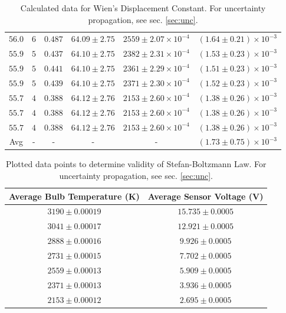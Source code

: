 \documentclass[12pt]{article}
\begin{document}
\begin{table}[htbp]
\begin{tabular}{cccccc}
        $56.0$ & $6$ & $0.487$ & $64.09 \pm 2.75$ & $2559 \pm 2.07 \times 10^{-4}$ & $(1.64 \pm 0.21) \times 10^{-3}$ \\
        $55.9$ & $5$ & $0.437$ & $64.10 \pm 2.75$ & $2382 \pm 2.31 \times 10^{-4}$ & $(1.53 \pm 0.23) \times 10^{-3}$ \\
        $55.9$ & $5$ & $0.441$ & $64.10 \pm 2.75$ & $2361 \pm 2.29 \times 10^{-4}$ & $(1.51 \pm 0.23) \times 10^{-3}$ \\
        $55.9$ & $5$ & $0.439$ & $64.10 \pm 2.75$ & $2371 \pm 2.30 \times 10^{-4}$ & $(1.52 \pm 0.23) \times 10^{-3}$ \\
        $55.7$ & $4$ & $0.388$ & $64.12 \pm 2.76$ & $2153 \pm 2.60 \times 10^{-4}$ & $(1.38 \pm 0.26) \times 10^{-3}$ \\
        $55.7$ & $4$ & $0.388$ & $64.12 \pm 2.76$ & $2153 \pm 2.60 \times 10^{-4}$ & $(1.38 \pm 0.26) \times 10^{-3}$ \\
        $55.7$ & $4$ & $0.388$ & $64.12 \pm 2.76$ & $2153 \pm 2.60 \times 10^{-4}$ & $(1.38 \pm 0.26) \times 10^{-3}$ \\
        \midrule
        Avg & - & - & - & -  & $(1.73 \pm 0.75) \times 10^{-3}$ \\
        \bottomrule
    \end{tabular}
      \caption{Calculated data for Wien's Displacement Constant. For uncertainty propagation, see sec. \ref{sec:unc}.}
      \label{table:wien}
\end{table}

\begin{table}[]
    \centering
\begin{tabular}{cc}
\hline
Average Bulb Temperature (K) & Average Sensor Voltage (V) \\
\hline
$3190 \pm 0.00019$ & $15.735 \pm 0.0005$ \\
$3041 \pm 0.00017$ & $12.921 \pm 0.0005$ \\
$2888 \pm 0.00016$ & $9.926 \pm 0.0005$ \\
$2731 \pm 0.00015$ & $7.702 \pm 0.0005$ \\
$2559 \pm 0.00013$ & $5.909 \pm 0.0005$ \\
$2371 \pm 0.00013$ & $3.936 \pm 0.0005$ \\
$2153 \pm 0.00012$ & $2.695 \pm 0.0005$ \\
\hline
\end{tabular}
    \caption{Plotted data points to determine validity of Stefan-Boltzmann Law. For uncertainty propagation, see sec. \ref{sec:unc}.}
    \label{tab:stefan}
\end{table}
\end{document}
